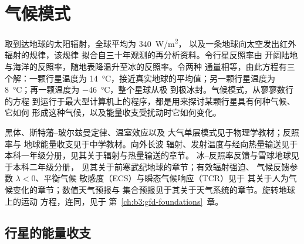 \chapter{气候模式}\label{ch:b3:climate-models}

取到达地球的太阳辐射，全球平均为 \qty{340}{W/m^2}，
以及一条地球向太空发出红外辐射的规律，该规律
拟合自三十年观测的再分析资料。令行星反照率由
开阔陆地与海洋的反照率，随地表降温升至冰的反照率。令两种
通量相等，由此方程有三个解：一颗行星温度为
\qty{14}{\celsius}，接近真实地球的平均值；另一颗行星温度为
\qty{8}{\celsius}；再一颗温度为 \qty{-46}{\celsius}，整个星球从极
到极冰封。气候模式，从寥寥数行的方程
到运行于最大型计算机上的程序，都是用来探讨某颗行星具有何种气候、它如何
形成这种气候，以及能量收支受扰动时它如何变化。

\begin{recall}
黑体、斯特藩–玻尔兹曼定律、温室效应以及
大气单层模式见于物理学教材；反照率与
地球能量收支见于中学教材。向外长波
辐射、发射温度与经向热量输送见于
本科一年级分册，见其关于辐射与热量输送的章节。
冰–反照率反馈与雪球地球见于本科二年级分册，
见其关于前寒武纪地球的章节；有效辐射强迫、
气候反馈参数 $\lambda < 0$、平衡气候
敏感度（ECS）与瞬态气候响应（TCR）见于
其关于人为气候变化的章节；数值天气预报与
集合预报见于其关于天气系统的章节。旋转地球上的运动
方程，连同，见于
第~\ref{ch:b3:gfd-foundations}~章。
\end{recall}

\section{行星的能量收支}\label{sec:b3:climate-models:zero-d}

